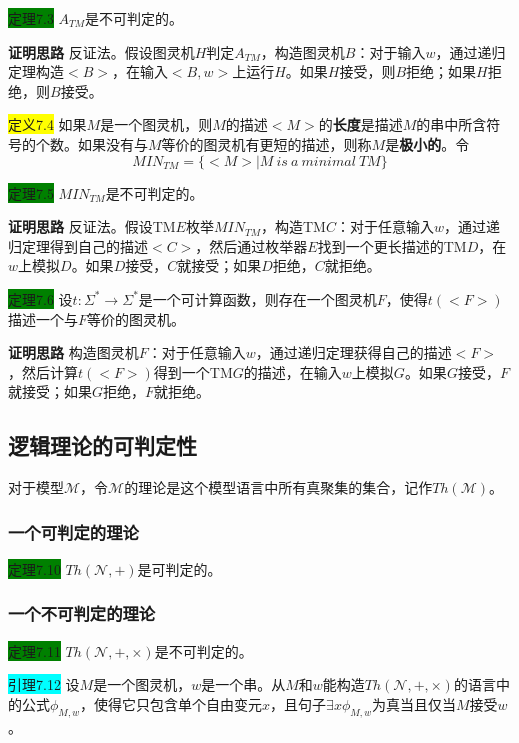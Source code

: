 \documentclass[a4paper]{article}
\begin{document}
	\colorbox{green}{定理7.3} $A_{TM}$是不可判定的。
	
	\textbf{证明思路} \quad 反证法。假设图灵机$H$判定$A_{TM}$，构造图灵机$B$：对于输入$w$，通过递归定理构造$<B>$，在输入$<B,w>$上运行$H$。如果$H$接受，则$B$拒绝；如果$H$拒绝，则$B$接受。

	\colorbox{yellow}{定义7.4} 如果$M$是一个图灵机，则$M$的描述$<M>$的\textbf{长度}是描述$M$的串中所含符号的个数。如果没有与$M$等价的图灵机有更短的描述，则称$M$是\textbf{极小的}。令
	$$MIN_{TM}=\{<M>|M~is~a~minimal~TM\}$$

	\colorbox{green}{定理7.5} $MIN_{TM}$是不可判定的。
	
	\textbf{证明思路} \quad 反证法。假设TM$E$枚举$MIN_{TM}$，构造TM$C$：对于任意输入$w$，通过递归定理得到自己的描述$<C>$，然后通过枚举器$E$找到一个更长描述的TM$D$，在$w$上模拟$D$。如果$D$接受，$C$就接受；如果$D$拒绝，$C$就拒绝。
	
	\colorbox{green}{定理7.6} 设$t:\Sigma^* \rightarrow \Sigma^*$是一个可计算函数，则存在一个图灵机$F$，使得$t(<F>)$描述一个与$F$等价的图灵机。
	
	\textbf{证明思路} \quad 构造图灵机$F$：对于任意输入$w$，通过递归定理获得自己的描述$<F>$，然后计算$t(<F>)$得到一个TM$G$的描述，在输入$w$上模拟$G$。如果$G$接受，$F$就接受；如果$G$拒绝，$F$就拒绝。

\subsection{逻辑理论的可判定性}

	对于模型$\mathcal{M}$，令$\mathcal{M}$的理论是这个模型语言中所有真聚集的集合，记作$Th(\mathcal{M})$。

\subsubsection{一个可判定的理论}

	\colorbox{green}{定理7.10} $Th(\mathcal{N},+)$是可判定的。

\subsubsection{一个不可判定的理论}

	\colorbox{green}{定理7.11} $Th(\mathcal{N},+, \times)$是不可判定的。
	
	\colorbox{cyan}{引理7.12} 设$M$是一个图灵机，$w$是一个串。从$M$和$w$能构造$Th(\mathcal{N},+, \times)$的语言中的公式$\phi_{M,w}$，使得它只包含单个自由变元$x$，且句子$\exists x \phi_{M,w}$为真当且仅当$M$接受$w$。
\end{document}
